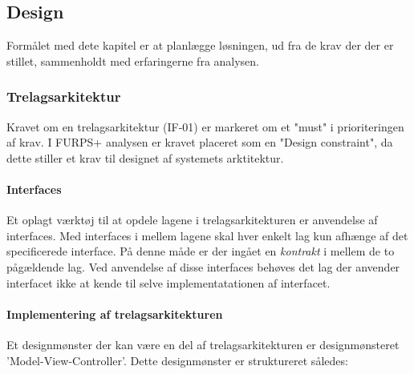 \subsection{Design}

Formålet med dete kapitel er at planlægge løsningen, ud fra de krav der der er
stillet, sammenholdt med erfaringerne fra analysen.


\subsubsection{Trelagsarkitektur}%
\label{ssub:3_lags_arkiteturen}

Kravet om en trelagsarkitektur (IF-01) er markeret om et "must" i prioriteringen af
krav. I FURPS+ analysen er kravet placeret som en "Design constraint", da dette
stiller et krav til designet af systemets arktitektur. 


\paragraph{Interfaces} Et oplagt værktøj til at opdele lagene i
trelagsarkitekturen er anvendelse af interfaces. Med interfaces i mellem lagene 
skal hver enkelt lag kun afhænge af det specificerede interface. På denne måde
er der ingået en \emph{kontrakt} i mellem de to pågældende lag.
Ved anvendelse af disse interfaces behøves det lag der anvender interfacet ikke
at kende til selve implementatationen af interfacet.

\paragraph{Implementering af trelagsarkitekturen}%
\label{par:implementering_af_trelagsarkitekturen}

Et designmønster der kan være en del af trelagsarkitekturen er designmønsteret
'Model-View-Controller'. Dette designmønster er struktureret således:

